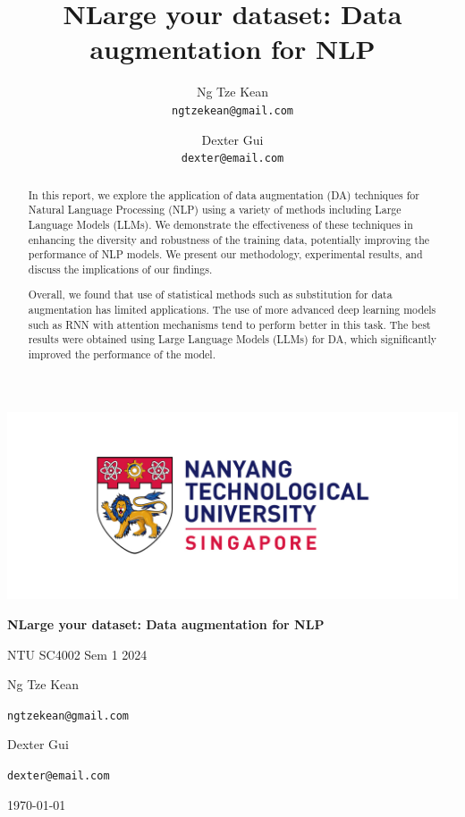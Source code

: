 \documentclass{article}
\title{NLarge your dataset: Data augmentation for NLP}
\author{
  Ng Tze Kean \\
  \texttt{ngtzekean@gmail.com}
  \and
  Dexter Gui \\
  \texttt{dexter@email.com}
}
\begin{document}
\begin{titlepage}
  \centering
  \includegraphics[width=1\textwidth]{img/ntu_logo.jpg}\par\vspace{1cm}
  \vspace{1.5cm}
  {\huge\bfseries NLarge your dataset: Data augmentation for NLP\par}
  \vspace{0.5cm}
  {\large NTU SC4002 Sem 1 2024\par}
  \vspace{2cm}
  \begin{minipage}[t]{0.45\textwidth}
    \centering
    {\Large Ng Tze Kean\par}
    \texttt{ngtzekean@gmail.com}
  \end{minipage}
  \hfill
  \begin{minipage}[t]{0.45\textwidth}
    \centering
    {\Large Dexter Gui\par}
    \texttt{dexter@email.com}
  \end{minipage}
  \vfill
  \today
\end{titlepage}

\begin{abstract}

  In this report, we explore the application of data augmentation (DA) techniques
  for Natural Language Processing (NLP) using a variety of methods including
  Large Language Models (LLMs). We demonstrate the effectiveness of these
  techniques in enhancing the diversity and robustness of the training data,
  potentially improving the performance of NLP models. We present our
  methodology, experimental results, and discuss the implications of our
  findings.

  Overall, we found that use of statistical methods such as substitution for data
  augmentation has limited applications. The use of more advanced deep learning
  models such as RNN with attention mechanisms tend to perform better in this
  task. The best results were obtained using Large Language Models (LLMs) for DA,
  which significantly improved the performance of the model.

\end{abstract}
\end{document}
